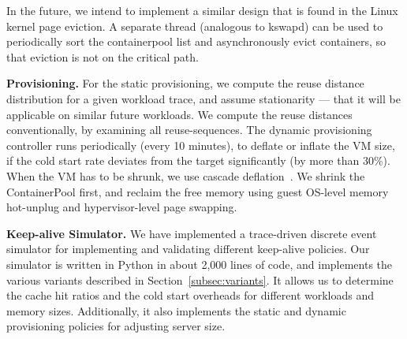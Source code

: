 In the future, we intend to implement a similar design that is found in the Linux kernel page eviction. A separate thread (analogous to kswapd) can be used to periodically sort the containerpool list and asynchronously evict containers, so that eviction is not on the critical path. 





\noindent \textbf{Provisioning.}
For the static provisioning, we compute the reuse distance distribution for a given workload trace, and assume stationarity --- that it will be applicable on similar future workloads. 
We compute the reuse distances conventionally, by examining all reuse-sequences.
The dynamic provisioning controller runs periodically (every 10 minutes), to deflate or inflate the VM size, if the cold start rate deviates from the target significantly (by more than 30\%).
When the VM has to be shrunk, we use cascade deflation~\cite{deflation-eurosys19}.
We shrink the ContainerPool first, and reclaim the free memory using guest OS-level memory hot-unplug and hypervisor-level page swapping. 



\noindent \textbf{Keep-alive Simulator.}
We have implemented a trace-driven discrete event simulator for implementing and validating different keep-alive policies.
Our simulator is written in Python in about 2,000 lines of code, and implements the various variants described in Section~\ref{subsec:variants}. 
It allows us to determine the cache hit ratios and the cold start overheads for different workloads and memory sizes.
Additionally, it also implements the static and dynamic provisioning policies for adjusting server size.

